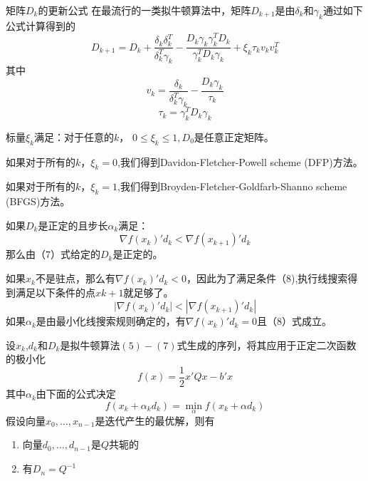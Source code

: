 \documentclass[handout,10pt]{beamer} %
\begin{document}
\begin{frame}{矩阵$D_k$的更新公式}
在最流行的一类拟牛顿算法中，矩阵$D_{k+1}$是由$\delta_k$和$\gamma_k$通过如下公式计算得到的
\begin{equation}\label{EQ_1_3_1}
    D_{k+1}=D_k+\frac{\delta_k\delta_k^{T}}{\delta_k^{T}\gamma_k}-\frac{D_k\gamma_k\gamma_k^{T}D_k}{\gamma_k^{T}D_k\gamma_k}+\xi_k\tau_kv_kv_k^{T}
\end{equation} 
其中
$$v_k=\frac{\delta_k}{\delta_k^{T}\gamma_k}-\frac{D_k\gamma_k}{\tau_k}$$
$$\tau_k=\gamma_k^{T}D_k\gamma_k$$

标量$\xi_k$满足：对于任意的$k$，
$0 \leq \xi_k \leq 1,$$D_0$是任意正定矩阵。

如果对于所有的$k$，$\xi_k=0$,我们得到Davidon-Fletcher-Powell scheme (DFP)方法。

如果对于所有的$k$，$\xi_k=1$,我们得到Broyden-Fletcher-Goldfarb-Shanno scheme (BFGS)方法。
\end{frame}

\begin{frame}
\begin{theorem}[命题]
    如果$D_k$是正定的且步长$\alpha_k$满足：
    \begin{equation}\label{EQ_1_3_1}
    \nabla f(x_k)'d_k<\nabla f(x_{k+1})'d_k
    \end{equation}
    那么由（$7$）式给定的$D_k$是正定的。
\end{theorem}    
如果$x_k$不是驻点，那么有$\nabla f(x_k)'d_k<0$，因此为了满足条件（$8$),执行线搜索得到满足以下条件的点$x{k+1}$就足够了。
$$|\nabla f(x_k)'d_k|<|\nabla f(x_{k+1})'d_k|$$
如果$\alpha_k$是由最小化线搜索规则确定的，有$\nabla f(x_k)'d_k=0$且（$8$）式成立。
\end{frame}

\begin{frame}
\begin{theorem}[命题]
    设{$x_k$},{$d_k$}和{$D_k$}是拟牛顿算法$(5)-(7)$式生成的序列，将其应用于正定二次函数的极小化
    $$f(x)=\frac{1}{2}x'Qx-b'x$$
    其中$\alpha_k$由下面的公式决定
    $$f(x_k+\alpha_kd_k)=\min_{\alpha}f(x_k+\alpha d_k)$$
    假设向量$x_0,…,x_{n-1}$是迭代产生的最优解，则有
    \begin{enumerate}
        \item 向量$d_0,…,d_{n-1}$是$Q$共轭的
        \item 有$D_n=Q^{-1}$
    \end{enumerate}
    
    
\end{theorem}    

\end{frame}
\end{document}
